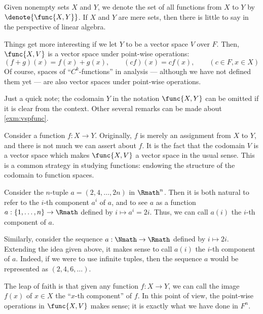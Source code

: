 \begin{example}
    \label{exm:vspfunc}
    Given nonempty sets \(X\) and \(Y\),
    we denote the set of all functions from \(X\) to \(Y\) by
    \(\denote{\func{X,Y}}\).
    If \(X\) and \(Y\) are mere sets,
    then there is little to say in the perspective of linear algebra.

    Things get more interesting if
    we let \(Y\) to be a vector space \(V\) over \(F\).
    Then, \(\func{X,V}\) is a vector space under point-wise operations:
    \[
        (f+g)(x)=f(x)+g(x),
        \qquad
        (cf)(x)=cf(x),
        \qquad
        (c\in F, x\in X)
    \]
    Of course, spaces of ``\(C^k\)-functions'' in analysis
    --- although we have not defined them yet ---
    are also vector spaces under point-wise operations.
\end{example}

Just a quick note;
the codomain \(Y\) in the notation \(\func{X,Y}\) can be omitted
if it is clear from the context.
Other several remarks can be made about \cref{exm:vspfunc}.

\begin{remark}
    \label{rmk:funcsp1}
    Consider a function \(f:X\to Y\).
    Originally, \(f\) is merely an assignment from \(X\) to \(Y\),
    and there is not much we can assert about \(f\).
    It is the fact that the codomain \(V\) is a vector space
    which makes \(\func{X,V}\) a vector space in the usual sense.
    This is a common strategy in studying functions:
    endowing the structure of the codomain to function spaces.
\end{remark}
\begin{remark}
    \label{rmk:funcsp2}
    Consider the \(n\)-tuple \(a=(2,4,\dots,2n)\) in \(\Rmath^n\).
    Then it is both natural to
    refer to the \(i\)-th component \(a^i\) of \(a\),
    and to see \(a\) as a function \(a:\{1,\dots,n\}\to\Rmath\)
    defined by \(i\mapsto a^i=2i\).
    Thus, we can call \(a(i)\) the \(i\)-th component of \(a\).

    Similarly, consider the sequence \(a:\Nmath\to\Rmath\)
    defined by \(i\mapsto 2i\).
    Extending the idea given above,
    it makes sense to call \(a(i)\) the \(i\)-th component of \(a\).
    Indeed, if we were to use infinite tuples,
    then the sequence \(a\) would be represented as \((2,4,6,\dots)\).

    The leap of faith is that
    given any function \(f:X\to Y\),
    we can call the image \(f(x)\) of \(x\in X\)
    the ``\(x\)-th component'' of \(f\).
    In this point of view,
    the point-wise operations in \(\func{X,V}\) makes sense;
    it is exactly what we have done in \(F^n\).
\end{remark}

